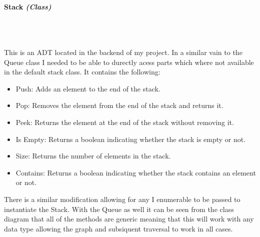 \begin{FlushLeft}
    \pagebreak
\paragraph{Stack \textit{(Class)}} \mbox{} \\

    \begin{figure}[H]
        \centering
    \end{figure}\\

    This is an ADT located in the backend of my project. In a similar vain to the Queue class I needed to be able to durectly acess parts which where not available in the default stack class. It contains the following:

    \begin{itemize}
        \item Push: Adds an element to the end of the stack.
        \item Pop: Removes the element from the end of the stack and returns it.
        \item Peek: Returns the element at the end of the stack without removing it.
        \item Is Empty: Returns a boolean indicating whether the stack is empty or not.
        \item Size: Returns the number of elements in the stack.
        \item Contains: Returns a boolean indicating whether the stack contains an element or not.
    \end{itemize}

    There is a similar modification allowing for any I enumerable to be passed to instantiate the Stack. With the Queue as well it can be seen from the class diagram that all of the methods are generic meaning that this will work with any data type allowing the graph and subsiquent traversal to work in all cases.\\


\end{FlushLeft}
